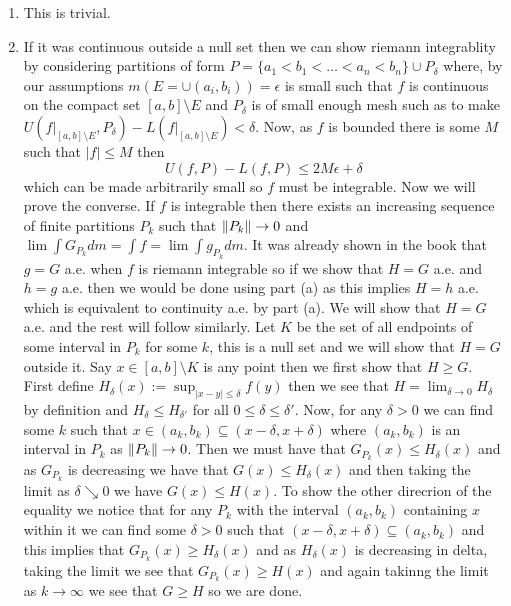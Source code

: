 \documentclass[12pt,a4paper]{article}
\begin{document}
\begin{solution}
\begin{enumerate}[label=\alph*.]
	\item This is trivial.
	\item If it was continuous outside a null set then we can show riemann integrablity by considering partitions of form $P=\{a_1<b_1<\ldots<a_n<b_n\}\cup P_\delta$ where, by our assumptions $m(E=\cup(a_i,b_i))=\epsilon$ is small such that $f$ is continuous on the compact set $[a,b]\setminus E$ and $P_\delta$ is of small enough mesh such as to make $U(f|_{[a,b]\setminus E},P_\delta)-L(f|_{[a,b]\setminus E})<\delta$.
	Now, as $f$ is bounded there is some $M$ such that $|f|\leq M$ then
	$$U(f,P)-L(f,P)\leq 2M\epsilon+\delta$$
	which can be made arbitrarily small so $f$ must be integrable.
	Now we will prove the converse. If $f$ is integrable then there exists an increasing sequence of finite partitions $P_k$ such that $\norm{P_k}\to 0$ and $\lim\int G_{P_k}dm =\int f=\lim\int g_{P_k}dm$. It was already shown in the book that $g=G$ a.e. when $f$ is riemann integrable so if we show that $H=G$ a.e. and $h=g$ a.e. then we would be done using part (a) as this implies $H=h$ a.e. which is equivalent to continuity a.e. by part (a). 
	We will show that $H=G$ a.e. and the rest will follow similarly. Let $K$ be the set of all endpoints of some interval in $P_k$ for some $k$, this is a null set and we will show that $H=G$ outside it. 
	Say $x\in[a,b]\setminus K$ is any point then we first show that $H\geq G.$ 
First define $H_\delta(x):=\sup_{|x-y|\leq\delta}f(y)$ then we see that $H=\lim_{\delta\to 0}H_\delta$ by definition and $H_\delta\leq H_{\delta'}$ for all $0\leq\delta\leq\delta'$. 
Now, for any $\delta>0$ we can find some $k$ such that $x\in(a_k,b_k)\subseteq(x-\delta,x+\delta)$ where $(a_k,b_k)$ is an interval in $P_k$ as $\norm{P_k}\to 0$. 
Then we must have that $G_{P_k}(x)\leq H_\delta(x)$ and as $G_{P_k}$ is decreasing we have that $G(x)\leq H_\delta(x)$ and then taking the limit as $\delta\searrow 0$ we have $G(x)\leq H(x)$. 
To show the other direcrion of the equality we notice that for any $P_k$ with the interval $(a_k,b_k)$ containing $x$ within it we can find some $\delta>0$ such that $(x-\delta,x+\delta)\subseteq(a_k,b_k)$ and this implies that $G_{P_k}(x)\geq H_\delta(x)$ and as $H_\delta(x)$ is decreasing in delta, taking the limit we see that $G_{P_k}(x)\geq H(x)$ and again takinng the limit as $k\to\infty$ we see that $G\geq H$ so we are done.
\end{enumerate}
\end{solution}
\end{document}
